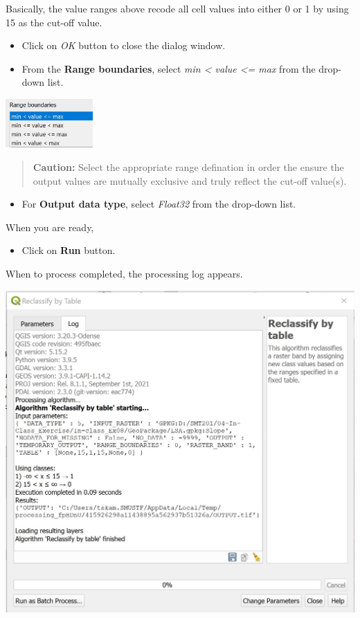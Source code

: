 \documentclass[
  letterpaper,
  DIV=11,
  numbers=noendperiod]{scrreprt}
\providecommand{\tightlist}{%
  \setlength{\itemsep}{0pt}\setlength{\parskip}{0pt}}\usepackage{longtable,booktabs,array}
\begin{document}
Basically, the value ranges above recode all cell values into either 0
or 1 by using 15 as the cut-off value.

\begin{itemize}
\tightlist
\item
  Click on \emph{OK} button to close the dialog window.
\item
  From the \textbf{Range boundaries}, select \emph{min \textless{} value
  \textless= max} from the drop-down list.
\end{itemize}

\includegraphics[width=0.25\textwidth,height=\textheight]{./img07/image35.jpg}

\begin{quote}
\textbf{Caution:} Select the appropriate range defination in order the
ensure the output values are mutually exclusive and truly reflect the
cut-off value(s).
\end{quote}

\begin{itemize}
\tightlist
\item
  For \textbf{Output data type}, select \emph{Float32} from the
  drop-down list.
\end{itemize}

When you are ready,

\begin{itemize}
\tightlist
\item
  Click on \textbf{Run} button.
\end{itemize}

When to process completed, the processing log appears.

\includegraphics{./img07/image36.jpg}
\end{document}
